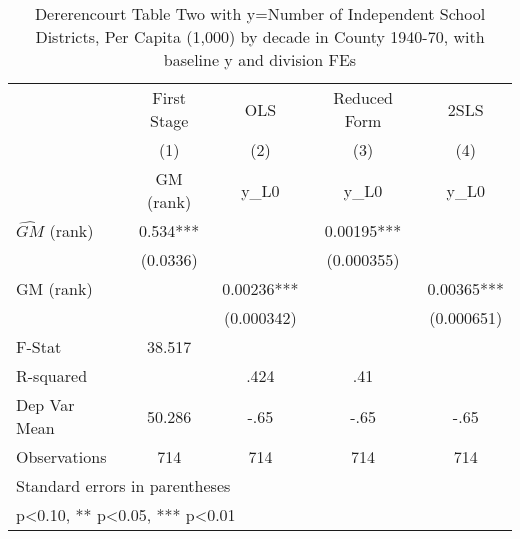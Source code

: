 \begin{table}[htbp]\centering
\def\sym#1{\ifmmode^{#1}\else\(^{#1}\)\fi}
\caption{Dererencourt Table Two with y=Number of Independent School Districts, Per Capita (1,000) by decade in County 1940-70, with baseline y and division FEs}
\begin{tabular}{l*{4}{c}}
\toprule
                    & First Stage   &         OLS   &Reduced Form   &        2SLS   \\
                    &\multicolumn{1}{c}{(1)}&\multicolumn{1}{c}{(2)}&\multicolumn{1}{c}{(3)}&\multicolumn{1}{c}{(4)}\\
                    &\multicolumn{1}{c}{GM  (rank)}&\multicolumn{1}{c}{y\_L0}&\multicolumn{1}{c}{y\_L0}&\multicolumn{1}{c}{y\_L0}\\
\midrule
$\hat{GM}$ (rank)   &       0.534***&               &     0.00195***&               \\
                    &    (0.0336)   &               &  (0.000355)   &               \\
\addlinespace
GM  (rank)          &               &     0.00236***&               &     0.00365***\\
                    &               &  (0.000342)   &               &  (0.000651)   \\
\midrule
F-Stat              &      38.517   &               &               &               \\
R-squared           &               &        .424   &         .41   &               \\
Dep Var Mean        &      50.286   &        -.65   &        -.65   &        -.65   \\
Observations        &         714   &         714   &         714   &         714   \\
\bottomrule
\multicolumn{5}{l}{\footnotesize Standard errors in parentheses}\\
\multicolumn{5}{l}{\footnotesize * p<0.10, ** p<0.05, *** p<0.01}\\
\end{tabular}
\end{table}
